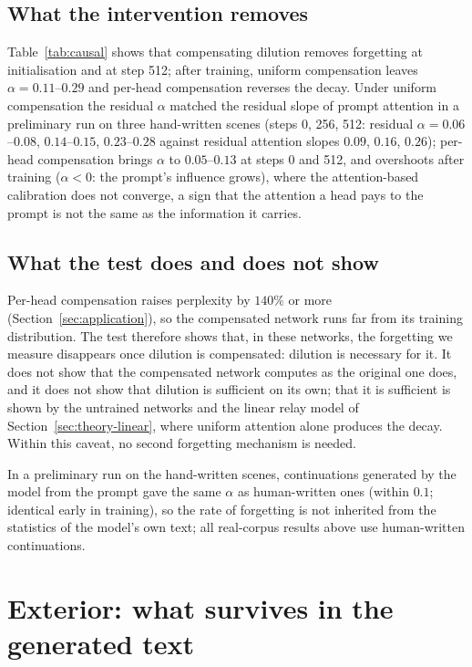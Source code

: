 \documentclass[11pt]{article}
\theoremstyle{definition}
\theoremstyle{remark}
\begin{document}
\subsection{What the intervention removes}\label{sec:causal-results}

Table~\ref{tab:causal} shows that compensating dilution removes forgetting at initialisation and at step 512; after training, uniform compensation leaves $\alpha=0.11$--$0.29$ and per-head compensation reverses the decay. Under uniform compensation the residual $\alpha$ matched the residual slope of prompt attention in a preliminary run on three hand-written scenes (steps 0, 256, 512: residual $\alpha=0.06$--$0.08$, $0.14$--$0.15$, $0.23$--$0.28$ against residual attention slopes $0.09$, $0.16$, $0.26$); per-head compensation brings $\alpha$ to $0.05$--$0.13$ at steps 0 and 512, and overshoots after training ($\alpha<0$: the prompt's influence grows), where the attention-based calibration does not converge, a sign that the attention a head pays to the prompt is not the same as the information it carries.

\subsection{What the test does and does not show}\label{sec:causal-caveat}

Per-head compensation raises perplexity by $140\%$ or more (Section~\ref{sec:application}), so the compensated network runs far from its training distribution. The test therefore shows that, in these networks, the forgetting we measure disappears once dilution is compensated: dilution is necessary for it. It does not show that the compensated network computes as the original one does, and it does not show that dilution is sufficient on its own; that it is sufficient is shown by the untrained networks and the linear relay model of Section~\ref{sec:theory-linear}, where uniform attention alone produces the decay. Within this caveat, no second forgetting mechanism is needed.

In a preliminary run on the hand-written scenes, continuations generated by the model from the prompt gave the same $\alpha$ as human-written ones (within $0.1$; identical early in training), so the rate of forgetting is not inherited from the statistics of the model's own text; all real-corpus results above use human-written continuations.
\section{Exterior: what survives in the generated text}
\label{sec:exterior}
\end{document}
